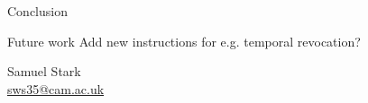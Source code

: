 \documentclass[11pt,aspectratio=169]{beamer}
\begin{document}
\begin{frame}{Conclusion}
{\begin{block}{Future work}
Add new instructions for e.g. temporal revocation\cite{xiaCHERIvokeCharacterisingPointer2019}?

\end{block}
\vspace{3.2em}
\begin{center}
    Samuel Stark\\\href{mailto:sws35@cam.ac.uk}{sws35@cam.ac.uk}
\end{center}%
}
    
\end{frame}

\appendix

\turnipbibframe{}

\end{document}

